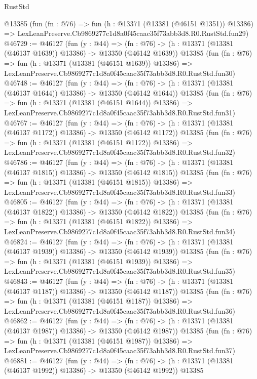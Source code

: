 \begin{lexlean}{RustStd}
\begin{coremodule}
    @13385
    (fun (fn : @76) =>
    fun (h : @13371 (@13381 (@46151 @1351)) @13386) =>
    LexLeanPreserve.Cb9869277c1d8a0f45caac35f73abb3d8.R0.RustStd.fun29)
@46729 := @46127
    (fun (y : @44) =>
    (fn : @76) -> (h : @13371 (@13381 (@46137 @1639)) @13386) -> @13350 (@46142 @1639))
    @13385
    (fun (fn : @76) =>
    fun (h : @13371 (@13381 (@46151 @1639)) @13386) =>
    LexLeanPreserve.Cb9869277c1d8a0f45caac35f73abb3d8.R0.RustStd.fun30)
@46748 := @46127
    (fun (y : @44) =>
    (fn : @76) -> (h : @13371 (@13381 (@46137 @1644)) @13386) -> @13350 (@46142 @1644))
    @13385
    (fun (fn : @76) =>
    fun (h : @13371 (@13381 (@46151 @1644)) @13386) =>
    LexLeanPreserve.Cb9869277c1d8a0f45caac35f73abb3d8.R0.RustStd.fun31)
@46767 := @46127
    (fun (y : @44) =>
    (fn : @76) -> (h : @13371 (@13381 (@46137 @1172)) @13386) -> @13350 (@46142 @1172))
    @13385
    (fun (fn : @76) =>
    fun (h : @13371 (@13381 (@46151 @1172)) @13386) =>
    LexLeanPreserve.Cb9869277c1d8a0f45caac35f73abb3d8.R0.RustStd.fun32)
@46786 := @46127
    (fun (y : @44) =>
    (fn : @76) -> (h : @13371 (@13381 (@46137 @1815)) @13386) -> @13350 (@46142 @1815))
    @13385
    (fun (fn : @76) =>
    fun (h : @13371 (@13381 (@46151 @1815)) @13386) =>
    LexLeanPreserve.Cb9869277c1d8a0f45caac35f73abb3d8.R0.RustStd.fun33)
@46805 := @46127
    (fun (y : @44) =>
    (fn : @76) -> (h : @13371 (@13381 (@46137 @1822)) @13386) -> @13350 (@46142 @1822))
    @13385
    (fun (fn : @76) =>
    fun (h : @13371 (@13381 (@46151 @1822)) @13386) =>
    LexLeanPreserve.Cb9869277c1d8a0f45caac35f73abb3d8.R0.RustStd.fun34)
@46824 := @46127
    (fun (y : @44) =>
    (fn : @76) -> (h : @13371 (@13381 (@46137 @1939)) @13386) -> @13350 (@46142 @1939))
    @13385
    (fun (fn : @76) =>
    fun (h : @13371 (@13381 (@46151 @1939)) @13386) =>
    LexLeanPreserve.Cb9869277c1d8a0f45caac35f73abb3d8.R0.RustStd.fun35)
@46843 := @46127
    (fun (y : @44) =>
    (fn : @76) -> (h : @13371 (@13381 (@46137 @1187)) @13386) -> @13350 (@46142 @1187))
    @13385
    (fun (fn : @76) =>
    fun (h : @13371 (@13381 (@46151 @1187)) @13386) =>
    LexLeanPreserve.Cb9869277c1d8a0f45caac35f73abb3d8.R0.RustStd.fun36)
@46862 := @46127
    (fun (y : @44) =>
    (fn : @76) -> (h : @13371 (@13381 (@46137 @1987)) @13386) -> @13350 (@46142 @1987))
    @13385
    (fun (fn : @76) =>
    fun (h : @13371 (@13381 (@46151 @1987)) @13386) =>
    LexLeanPreserve.Cb9869277c1d8a0f45caac35f73abb3d8.R0.RustStd.fun37)
@46881 := @46127
    (fun (y : @44) =>
    (fn : @76) -> (h : @13371 (@13381 (@46137 @1992)) @13386) -> @13350 (@46142 @1992))
    @13385

\end{coremodule}
\end{lexlean}
